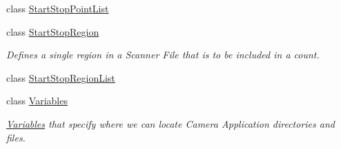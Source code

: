 \begin{DoxyCompactItemize}
class \hyperlink{class_k_k_l_s_c_1_1_start_stop_point_list}{Start\+Stop\+Point\+List}
\item 
class \hyperlink{class_k_k_l_s_c_1_1_start_stop_region}{Start\+Stop\+Region}
\begin{DoxyCompactList}\small\item\em Defines a single region in a Scanner File that is to be included in a count. \end{DoxyCompactList}\item 
class \hyperlink{class_k_k_l_s_c_1_1_start_stop_region_list}{Start\+Stop\+Region\+List}
\item 
class \hyperlink{class_k_k_l_s_c_1_1_variables}{Variables}
\begin{DoxyCompactList}\small\item\em \hyperlink{class_k_k_l_s_c_1_1_variables}{Variables} that specify where we can locate Camera Application directories and files. \end{DoxyCompactList}\end{DoxyCompactItemize}
